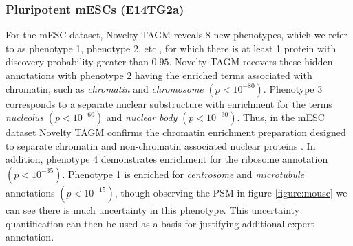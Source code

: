 \documentclass[12pt,english]{article}
\begin{document}
\subsubsection{Pluripotent mESCs (E14TG2a)}
For the mESC dataset, Novelty TAGM reveals $8$ new phenotypes, which we refer to as phenotype 1, phenotype 2, etc., for which there is at least 1 protein with discovery probability greater than $0.95$. Novelty TAGM recovers these hidden annotations with phenotype $2$ having the enriched terms associated with chromatin, such as \textit{chromatin} and \textit{chromosome} $(p < 10^{-80})$. Phenotype 3 corresponds to a separate nuclear substructure with enrichment for the terms \textit{nucleolus} $(p < 10^{-60})$ and \textit{nuclear body} $(p < 10^{-30})$. Thus, in the mESC dataset Novelty TAGM confirms the chromatin enrichment preparation designed to separate chromatin and non-chromatin associated nuclear proteins \citep{Mulvey:2017}. In addition, phenotype 4 demonstrates enrichment for the ribosome annotation $(p < 10^{-35})$. Phenotype 1 is enriched for \textit{centrosome} and \textit{microtubule} annotations $(p < 10^{-15})$, though observing the PSM in figure \ref{figure:mouse} we can see there is much uncertainty in this phenotype. This uncertainty quantification can then be used as a basis for justifying additional expert annotation.
\end{document}
